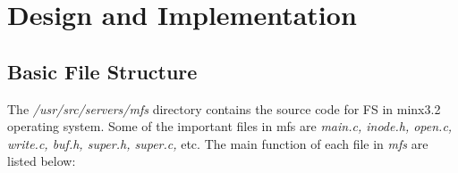 \chapter{Design and Implementation}
\label{chap3}
\section{Basic File Structure}

The \emph{/usr/src/servers/mfs} directory contains the source code for FS in
minx3.2 operating system. Some of the important files in mfs are \emph{main.c, inode.h, open.c, write.c, buf.h, super.h,
super.c,} etc. The main function of each file in \emph{mfs} are listed below:




